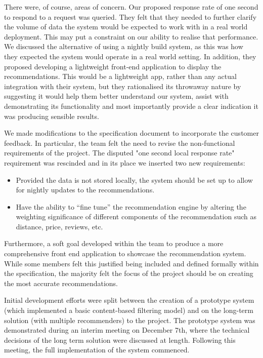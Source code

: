 \documentclass{l3proj}
\begin{document}
There were, of course, areas of concern. Our proposed response rate of one second to respond to a request was queried. They felt that they needed to further clarify the volume of data the system would be expected to work with in a real world deployment. This may put a constraint on our ability to realise that performance. We discussed the alternative of using a nightly build system, as this was how they expected the system would operate in a real world setting. In addition, they proposed developing a lightweight front-end application to display the recommendations. This would be a lightweight app, rather than any actual integration with their system, but they rationalised its throwaway nature by suggesting it would help them better understand our system, assist with demonstrating its functionality and most importantly provide a clear indication it was producing sensible results. 

We made modifications to the specification document to incorporate the customer feedback. In particular, the team felt the need to revise the non-functional requirements of the project. The disputed "one second local response rate" requirement was rescinded and in its place we inserted two new requirements:

\begin{itemize}
\item Provided the data is not stored locally, the system should be set up to allow for nightly updates to the recommendations.
\item Have the ability to “fine tune” the recommendation engine by altering the weighting significance of different components of the recommendation such as distance, price, 
reviews, etc.
\end{itemize}

Furthermore, a soft goal developed within the team to produce a more comprehensive front end application to showcase the recommendation system. While some members felt this justified being included and defined formally within the specification, the majority felt the focus of the project should be on creating the most accurate recommendations.

Initial development efforts were split between the creation of a prototype system (which implemented a basic content-based filtering model) and on the long-term solution (with multiple recommenders) to the project. The prototype system was demonstrated during an interim meeting on December 7th, where the technical decisions of the long term solution were discussed at length. Following this meeting, the full implementation of the system commenced. 
\end{document}
